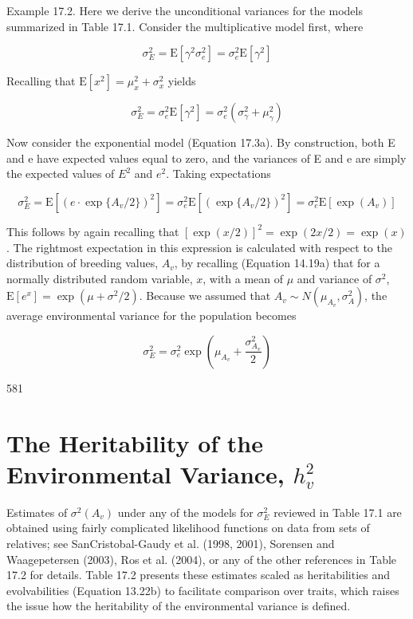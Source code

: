 \documentclass{article}
\begin{document}
Example 17.2. Here we derive the unconditional variances for the models summarized in Table 17.1. Consider the multiplicative model first, where

\begin{equation}
\sigma_{E}^{2}=\mathrm{E}[\gamma^{2}\sigma_{e}^{2}]=\sigma_{e}^{2}\mathrm{E}[\gamma^{2}]
\end{equation}

Recalling that  $ \mathrm{E}[x^{2}] = \mu_{x}^{2} + \sigma_{x}^{2} $ yields

\begin{equation}
\sigma_{E}^{2}=\sigma_{e}^{2}\mathrm{E}[\gamma^{2}]=\sigma_{e}^{2}\left(\sigma_{\gamma}^{2}+\mu_{\gamma}^{2}\right)
\end{equation}

Now consider the exponential model (Equation 17.3a). By construction, both E and e have expected values equal to zero, and the variances of E and e are simply the expected values of  $ E^{2} $ and  $ e^{2} $. Taking expectations

\begin{equation}
\sigma_{E}^{2}=\mathrm{E}\left[\left(e\cdot\exp\{A_{v}/2\}\right)^{2}\right]=\sigma_{e}^{2}\mathrm{E}\left[\left(\exp\{A_{v}/2\}\right)^{2}\right]=\sigma_{e}^{2}\mathrm{E}\left[\exp\left(A_{v}\right)\right]
\end{equation}

This follows by again recalling that  $ [\exp(x/2)]^2 = \exp(2x/2) = \exp(x) $. The rightmost expectation in this expression is calculated with respect to the distribution of breeding values,  $ A_v $, by recalling (Equation 14.19a) that for a normally distributed random variable,  $ x $, with a mean of  $ \mu $ and variance of  $ \sigma^2 $,  $ \mathrm{E}[e^x] = \exp(\mu + \sigma^2/2) $. Because we assumed that  $ A_v \sim N(\mu_{A_v}, \sigma_A^2) $, the average environmental variance for the population becomes

\begin{equation}
\sigma_{E}^{2}=\sigma_{e}^{2}\exp\left(\mu_{A_{v}}+\frac{\sigma_{A_{v}}^{2}}{2}\right)
\end{equation}

581

\section{The Heritability of the Environmental Variance,  $ h_{v}^{2} $}
Estimates of  $ \sigma^{2}(A_{v}) $ under any of the models for  $ \sigma_{E}^{2} $ reviewed in Table 17.1 are obtained using fairly complicated likelihood functions on data from sets of relatives; see SanCristobal-Gaudy et al. (1998, 2001), Sorensen and Waagepetersen (2003), Ros et al. (2004), or any of the other references in Table 17.2 for details. Table 17.2 presents these estimates scaled as heritabilities and evolvabilities (Equation 13.22b) to facilitate comparison over traits, which raises the issue how the heritability of the environmental variance is defined.
\end{document}
